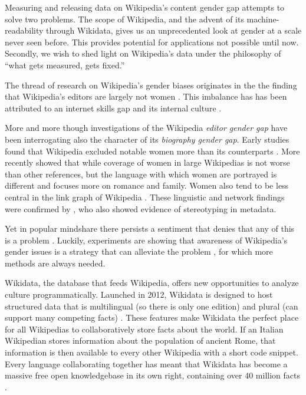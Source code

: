 \documentclass[letterpaper]{article}
\begin{document}
Measuring and releasing data on Wikipedia's content gender gap attempts to solve two problems. The scope of Wikipedia, and the advent of its machine-readability through Wikidata, gives us an unprecedented look at gender at a scale never seen before. This provides potential for applications not possible until now. Secondly, we wish to shed light on Wikipedia's data under the philosophy of ``what gets measured, gets fixed.''

The thread of research on Wikipedia's gender biases originates in the the finding that Wikipedia's editors are largely not women \cite{hill_wikipedia_2013}. This imbalance has has been attributed to an internet skills gap \cite{hargittai_mind_2015} and its internal culture \cite{lam_wp:clubhouse?:_2011}. 

More and more though investigations of the Wikipedia \textit{editor gender gap} have been interrogating also the character of its \textit{biography gender gap}. Early studies found that Wikipedia excluded notable women more than its counterparts \cite{reagle_gender_2011}. More recently \cite{wagner_its_2015} showed that while coverage of women in large Wikipedias is not worse than other references, but the language with which women are portrayed is different and focuses more on romance and family. Women also tend to be less central in the link graph of Wikipedia \cite{10.1371/journal.pone.0114825}. These linguistic and network findings were confirmed by \cite{graells-garrido_first_2015}, who also showed evidence of stereotyping in metadata. 

Yet in popular mindshare there persists a sentiment that denies that any of this is a problem \cite{eckert_retriggering_2013}. Luckily, experiments are showing that awareness of Wikipedia's gender issues is a strategy that can alleviate the problem \cite{hinnosaar_gender_2015}, for which more methods are always needed.

Wikidata, the database that feeds Wikipedia, offers new opportunities to analyze culture programmatically. Launched in 2012, Wikidata is designed to host structured data that is multilingual (so there is only one edition) and plural (can support many competing facts) \cite{vrandecic_wikidata:_2014}.  These features make Wikidata the perfect place for all Wikipedias to collaboratively store facts about the world. If an Italian Wikipedian stores information about the population of ancient Rome, that information is then available to every other Wikipedia with a short code snippet. Every language collaborating together has meant that Wikidata has become a massive free open knowledgebase in its own right, containing over 40 million facts \cite{krotzsch_how_????}.
\end{document}
